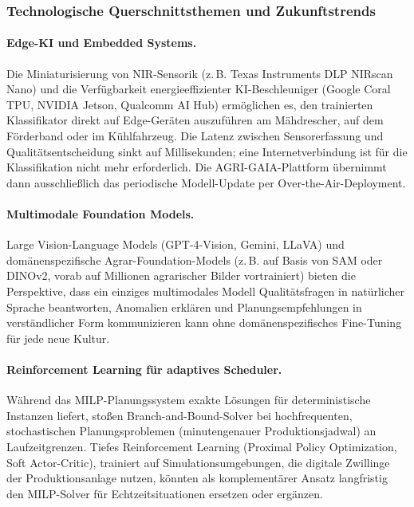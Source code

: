 \documentclass[a4paper, 12pt, twoside, openright]{report}
\theoremstyle{definition}
\theoremstyle{definition}
\begin{document}
\subsubsection{Technologische Querschnittsthemen und Zukunftstrends}

\paragraph{Edge-KI und Embedded Systems.}
Die Miniaturisierung von NIR-Sensorik (z.\,B. Texas Instruments
DLP NIRscan Nano) und die Verfügbarkeit energieeffizienter
KI-Beschleuniger (Google Coral TPU, NVIDIA Jetson, Qualcomm AI Hub)
ermöglichen es, den trainierten Klassifikator direkt auf Edge-Geräten
auszuführen am Mähdrescher, auf dem Förderband oder im Kühlfahrzeug.
Die Latenz zwischen Sensorerfassung und Qualitätsentscheidung
sinkt auf Millisekunden; eine Internetverbindung ist für die
Klassifikation nicht mehr erforderlich. Die AGRI-GAIA-Plattform
übernimmt dann ausschließlich das periodische Modell-Update
per Over-the-Air-Deployment.

\paragraph{Multimodale Foundation Models.}
Large Vision-Language Models (GPT-4-Vision, Gemini, LLaVA) und
domänenspezifische Agrar-Foundation-Models (z.\,B. auf Basis von
SAM oder DINOv2, vorab auf Millionen agrarischer Bilder vortrainiert)
bieten die Perspektive, dass ein einziges multimodales Modell
Qualitätsfragen in natürlicher Sprache beantworten, Anomalien
erklären und Planungsempfehlungen in verständlicher Form kommunizieren
kann ohne domänenspezifisches Fine-Tuning für jede neue Kultur.

\paragraph{Reinforcement Learning für adaptives Scheduler.}
Während das MILP-Planungs\-system exakte Lösungen für deterministische
Instanzen liefert, stoßen Branch-and-Bound-Solver bei hochfrequenten,
stochastischen Planungsproblemen (minutengenauer Produktionsjadwal)
an Laufzeitgrenzen. Tiefes Reinforcement Learning (Proximal Policy
Optimization, Soft Actor-Critic), trainiert auf Simulationsumgebungen,
die digitale Zwillinge der Produktionsanlage nutzen, könnten als
komplementärer Ansatz langfristig den MILP-Solver für Echtzeitsituationen
ersetzen oder ergänzen.
\end{document}
